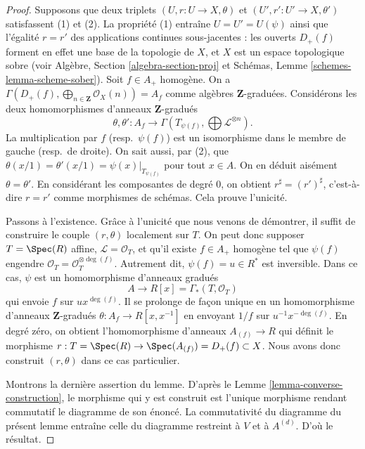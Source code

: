 \begin{proof}
Supposons que deux triplets $(U, r : U \to X, \theta)$ et
$(U', r' : U' \to X, \theta')$ satisfassent (1) et (2).
La propriété (1) entraîne $U = U' = U(\psi)$ ainsi que l'égalité
$r = r'$ des applications continues sous-jacentes : les ouverts $D_{+}(f)$
forment en effet une base de la topologie de $X$, et $X$ est un espace
topologique sobre (voir Algèbre, Section \ref{algebra-section-proj} et
Schémas, Lemme \ref{schemes-lemma-scheme-sober}).
Soit $f \in A_{+}$ homogène. On a
$\Gamma(D_{+}(f), \bigoplus_{n \in \mathbf{Z}} \mathcal{O}_X(n)) = A_f$
comme algèbres $\mathbf{Z}$-graduées. Considérons les deux homomorphismes
d'anneaux $\mathbf{Z}$-gradués
$$
\theta, \theta' :
A_f
\longrightarrow
\Gamma(T_{\psi(f)}, \bigoplus \mathcal{L}^{\otimes n}).
$$
La multiplication par $f$ (resp.\ $\psi(f)$) est un isomorphisme dans le
membre de gauche (resp.\ de droite). On sait aussi, par (2), que
$\theta(x/1) = \theta'(x/1) = \psi(x)|_{T_{\psi(f)}}$ pour tout $x \in A$.
On en déduit aisément $\theta = \theta'$. En considérant les composantes
de degré $0$, on obtient $r^\sharp = (r')^\sharp$, c'est-à-dire
$r = r'$ comme morphismes de schémas. Cela prouve l'unicité.

\medskip\noindent
Passons à l'existence. Grâce à l'unicité que nous venons de démontrer,
il suffit de construire le couple $(r, \theta)$ localement sur $T$.
On peut donc supposer $T = \Spec(R)$ affine, $\mathcal{L} = \mathcal{O}_T$,
et qu'il existe $f \in A_{+}$ homogène tel que $\psi(f)$ engendre
$\mathcal{O}_T = \mathcal{O}_T^{\otimes \deg(f)}$.
Autrement dit, $\psi(f) = u \in R^*$ est inversible. Dans ce cas, $\psi$
est un homomorphisme d'anneaux gradués
$$
A \longrightarrow R[x] = \Gamma_*(T, \mathcal{O}_T)
$$
qui envoie $f$ sur $ux^{\deg(f)}$. Il se prolonge de façon unique en un
homomorphisme d'anneaux $\mathbf{Z}$-gradués
$\theta : A_f \to R[x, x^{-1}]$ en envoyant $1/f$ sur
$u^{-1}x^{-\deg(f)}$. En degré zéro, on obtient l'homomorphisme d'anneaux
$A_{(f)} \to R$ qui définit le morphisme
$r : T = \Spec(R) \to \Spec(A_{(f)}) = D_{+}(f) \subset X$.
Nous avons donc construit $(r, \theta)$ dans ce cas particulier.

\medskip\noindent
Montrons la dernière assertion du lemme. D'après le
Lemme \ref{lemma-converse-construction}, le morphisme qui y est construit
est l'unique morphisme rendant commutatif le diagramme de son énoncé.
La commutativité du diagramme du présent lemme entraîne celle du diagramme
restreint à $V$ et à $A^{(d)}$. D'où le résultat.
\end{proof}

